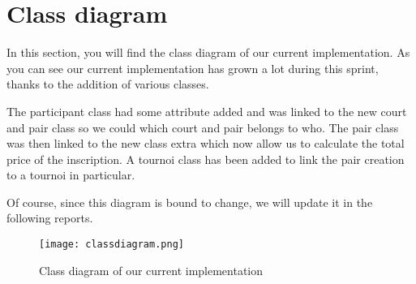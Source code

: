 \section{Class diagram}

In this section, you will find the class diagram of our current implementation. As you can see 
our current implementation has grown a lot during this sprint, thanks to the addition of various classes. \newline

The participant class had some attribute added and was linked to the new court and pair class so we could which court and pair belongs to who. The pair class was then linked to the new class extra which now allow us to calculate the total price of the inscription. A tournoi class has been added to link the pair creation to a tournoi in particular. \newline

Of course, since this diagram is bound to change, we will update it in the following reports.

\begin{figure}[!ht]
	\centering
	\texttt{[image: classdiagram.png]}
	\caption{Class diagram of our current implementation}
	\label{fig:length_eight_mouse}
\end{figure}
\FloatBarrier
